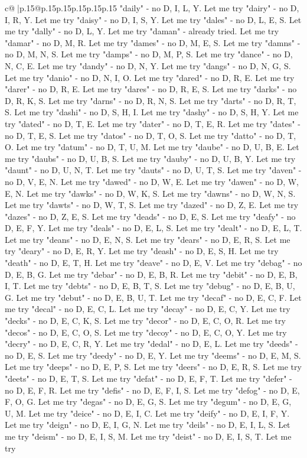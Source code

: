 \documentclass{article}
\begin{document}
{\begin{supertabular}{c@{$\;$}|p{.15\linewidth}@{}p{.15\linewidth}p{.15\linewidth}p{.15\linewidth}p{.15\linewidth}p{.15\linewidth}}
{{{"daily" {-} no D, I, L, Y. Let me try "dairy" {-} no D, I, R, Y. Let me try "daisy" {-} no D, I, S, Y. Let me try "dales" {-} no D, L, E, S. Let me try "dally" {-} no D, L, Y. Let me try "daman" {-} already tried. Let me try "damar" {-} no D, M, R. Let me try "dames" {-} no D, M, E, S. Let me try "damns" {-} no D, M, N, S. Let me try "damps" {-} no D, M, P, S. Let me try "dance" {-} no D, N, C, E. Let me try "dandy" {-} no D, N, Y. Let me try "dangs" {-} no D, N, G, S. Let me try "danio" {-} no D, N, I, O. Let me try "dared" {-} no D, R, E. Let me try "darer" {-} no D, R, E. Let me try "dares" {-} no D, R, E, S. Let me try "darks" {-} no D, R, K, S. Let me try "darns" {-} no D, R, N, S. Let me try "darts" {-} no D, R, T, S. Let me try "dashi" {-} no D, S, H, I. Let me try "dashy" {-} no D, S, H, Y. Let me try "dated" {-} no D, T, E. Let me try "dater" {-} no D, T, E, R. Let me try "dates" {-} no D, T, E, S. Let me try "datos" {-} no D, T, O, S. Let me try "datto" {-} no D, T, O. Let me try "datum" {-} no D, T, U, M. Let me try "daube" {-} no D, U, B, E. Let me try "daubs" {-} no D, U, B, S. Let me try "dauby" {-} no D, U, B, Y. Let me try "daunt" {-} no D, U, N, T. Let me try "dauts" {-} no D, U, T, S. Let me try "daven" {-} no D, V, E, N. Let me try "dawed" {-} no D, W, E. Let me try "dawen" {-} no D, W, E, N. Let me try "dawks" {-} no D, W, K, S. Let me try "dawns" {-} no D, W, N, S. Let me try "dawts" {-} no D, W, T, S. Let me try "dazed" {-} no D, Z, E. Let me try "dazes" {-} no D, Z, E, S. Let me try "deads" {-} no D, E, S. Let me try "deafy" {-} no D, E, F, Y. Let me try "deals" {-} no D, E, L, S. Let me try "dealt" {-} no D, E, L, T. Let me try "deans" {-} no D, E, N, S. Let me try "dears" {-} no D, E, R, S. Let me try "deary" {-} no D, E, R, Y. Let me try "deash" {-} no D, E, S, H. Let me try "death" {-} no D, E, T, H. Let me try "deave" {-} no D, E, V. Let me try "debag" {-} no D, E, B, G. Let me try "debar" {-} no D, E, B, R. Let me try "debit" {-} no D, E, B, I, T. Let me try "debts" {-} no D, E, B, T, S. Let me try "debug" {-} no D, E, B, U, G. Let me try "debut" {-} no D, E, B, U, T. Let me try "decaf" {-} no D, E, C, F. Let me try "decal" {-} no D, E, C, L. Let me try "decay" {-} no D, E, C, Y. Let me try "decks" {-} no D, E, C, K, S. Let me try "decor" {-} no D, E, C, O, R. Let me try "decos" {-} no D, E, C, O, S. Let me try "decoy" {-} no D, E, C, O, Y. Let me try "decry" {-} no D, E, C, R, Y. Let me try "dedal" {-} no D, E, L. Let me try "deeds" {-} no D, E, S. Let me try "deedy" {-} no D, E, Y. Let me try "deems" {-} no D, E, M, S. Let me try "deeps" {-} no D, E, P, S. Let me try "deers" {-} no D, E, R, S. Let me try "deets" {-} no D, E, T, S. Let me try "defat" {-} no D, E, F, T. Let me try "defer" {-} no D, E, F, R. Let me try "defis" {-} no D, E, F, I, S. Let me try "defog" {-} no D, E, F, O, G. Let me try "degas" {-} no D, E, G, S. Let me try "degum" {-} no D, E, G, U, M. Let me try "deice" {-} no D, E, I, C. Let me try "deify" {-} no D, E, I, F, Y. Let me try "deign" {-} no D, E, I, G, N. Let me try "deils" {-} no D, E, I, L, S. Let me try "deism" {-} no D, E, I, S, M. Let me try "deist" {-} no D, E, I, S, T. Let me try }}}
\end{supertabular}}
\end{document}
